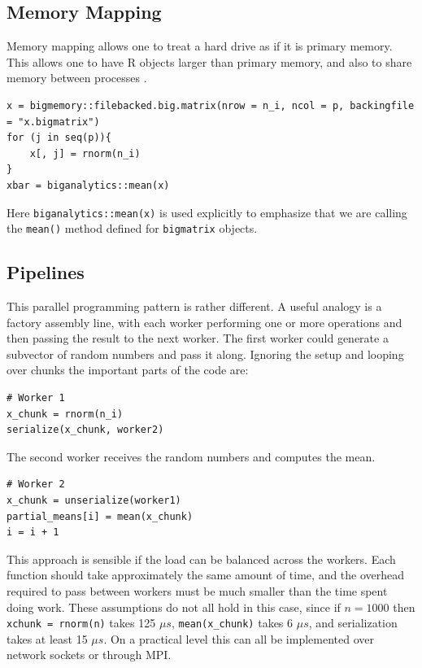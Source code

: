 \documentclass[12pt]{article}
\begin{document}
\subsection{Memory Mapping}

Memory mapping allows one to treat a hard drive as if it is primary memory.
This allows one to have R objects larger than primary memory, and also to
share memory between processes \cite{bigmemory}.

\begin{verbatim}
x = bigmemory::filebacked.big.matrix(nrow = n_i, ncol = p, backingfile = "x.bigmatrix")
for (j in seq(p)){
    x[, j] = rnorm(n_i)
}
xbar = biganalytics::mean(x)
\end{verbatim}

Here \texttt{biganalytics::mean(x)} is used explicitly to emphasize that we
are calling the \texttt{mean()} method defined for \texttt{bigmatrix}
objects.

\subsection{Pipelines}

This parallel programming pattern is rather different. A useful analogy is a
factory assembly line, with each worker performing one or more operations
and then passing the result to the next worker. The first worker could generate a
subvector of random numbers and pass it along. Ignoring the setup and
looping over chunks the important parts of the code are:

\begin{verbatim}
# Worker 1
x_chunk = rnorm(n_i)
serialize(x_chunk, worker2)
\end{verbatim}

The second worker receives the random numbers and computes the mean.

\begin{verbatim}
# Worker 2
x_chunk = unserialize(worker1)
partial_means[i] = mean(x_chunk)
i = i + 1
\end{verbatim}

This approach is sensible if the load can be balanced across the workers.
Each function should take approximately the same amount of time, and the
overhead required to pass between workers must be much smaller than the
time spent doing work. These assumptions do not all hold in this case,
since if $n = 1000$ then \texttt{xchunk = rnorm(n)} takes 125 $\mu s$,
\texttt{mean(x\_chunk)} takes 6 $\mu s$, and serialization takes at least
15 $\mu s$. On a practical level this can all be implemented over network
sockets or through MPI.
\end{document}
